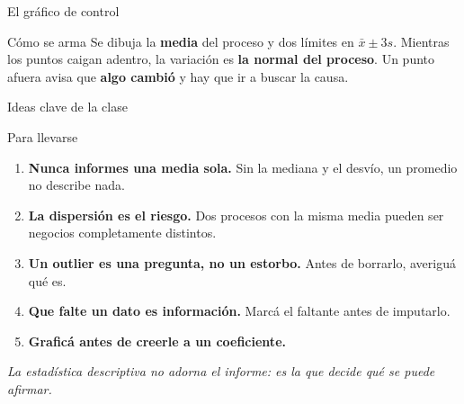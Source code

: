 \documentclass[aspectratio=169,10pt]{beamer}
\begin{document}
\begin{frame}{El gráfico de control}
  \begin{center}
  \end{center}
  \begin{block}{Cómo se arma}
    Se dibuja la \textbf{media} del proceso y dos límites en $\bar{x} \pm 3s$. Mientras los puntos
    caigan adentro, la variación es \textbf{la normal del proceso}. Un punto afuera avisa que
    \textbf{algo cambió} y hay que ir a buscar la causa.
  \end{block}
\end{frame}

\begin{frame}{Ideas clave de la clase}
  \begin{block}{Para llevarse}
    \begin{enumerate}
      \item \textbf{Nunca informes una media sola.} Sin la mediana y el desvío, un promedio no
            describe nada.
      \item \textbf{La dispersión es el riesgo.} Dos procesos con la misma media pueden ser
            negocios completamente distintos.
      \item \textbf{Un outlier es una pregunta, no un estorbo.} Antes de borrarlo, averiguá qué es.
      \item \textbf{Que falte un dato es información.} Marcá el faltante antes de imputarlo.
      \item \textbf{Graficá antes de creerle a un coeficiente.}
    \end{enumerate}
  \end{block}
  \vspace{0.4em}
  \begin{center}
  \emph{La estadística descriptiva no adorna el informe: es la que decide qué se puede afirmar.}
  \end{center}
\end{frame}
\end{document}
